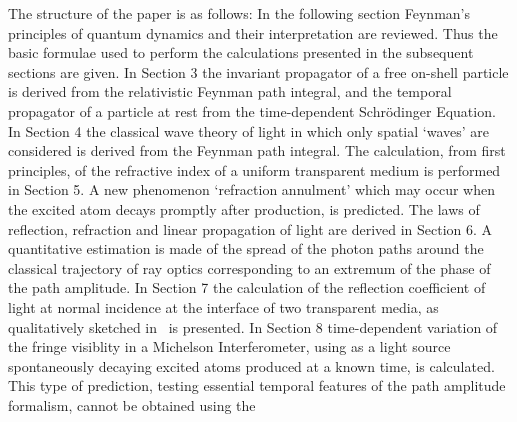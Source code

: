 \documentclass [12pt]{article}
\begin{document}
    \par The structure of the paper is as follows: In the following section Feynman's principles
    of quantum dynamics and their interpretation are reviewed. Thus the basic formulae used
   to perform the calculations presented in the subsequent sections are given. In Section 3
    the invariant propagator of a free on-shell particle is derived from the relativistic
    Feynman path integral, and the temporal propagator of a particle
    at rest from the time-dependent Schr\"{o}dinger Equation.
   In Section 4 the classical wave theory of light in which only
    spatial `waves' are considered is derived from the Feynman path integral. The calculation,
     from first principles, of the refractive index of a uniform transparent medium is 
    performed in Section 5. A new phenomenon `refraction annulment' which may occur when the
    excited atom decays promptly after production, is predicted. The laws of reflection, refraction
    and linear propagation of light are derived in Section 6. A quantitative estimation is made
   of the spread of the photon paths around the classical trajectory of ray optics corresponding
   to an extremum of the phase of the path amplitude. In Section 7 the calculation of the
    reflection coefficient of light at normal incidence at the interface of two transparent
   media, as qualitatively sketched in~\cite{Feyn1} is presented.  In Section 8 time-dependent
   variation of the fringe visiblity in a Michelson Interferometer, using as a light source
   spontaneously decaying excited atoms produced at a known time, is calculated.
   This type of prediction, testing
   essential temporal features of the path amplitude formalism, cannot be obtained using the
\end{document}
